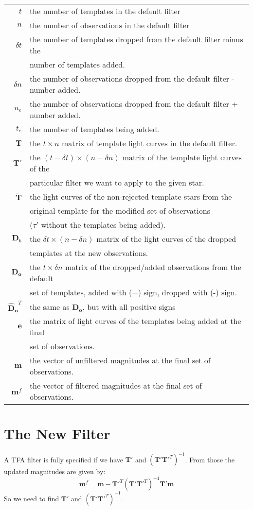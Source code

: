 \documentclass{article}
\begin{document}
\begin{tabular}{rl}
	$t$ & the number of templates in the default filter\\
%	
	$n$ & the number of observations in the default filter\\
%
	$\delta t$ & the number of templates dropped from the default filter 
	minus the \\&number of templates added.\\
%
	$\delta n$ & the number of observations dropped from the default filter -
	number added.\\
%
	$n_e$ & the number of observations dropped from the default filter +
	number added.\\
%
	$t_e$ & the number of templates being added. \\
%
	$\mathbf{T}$ & the $t\times n$ matrix of template light curves in the
	default filter.\\
%
	$\mathbf{T'}$ & the $(t-\delta t)\times(n-\delta n)$ matrix of the
	template light curves of the \\&particular filter we want to apply to the
	given star.\\
%
	$\mathbf{\tilde{T}}$ & the light curves of the non-rejected template
	stars from the \\&original template for the modified set of observations
	\\&($\tau'$ without the templates being added).\\
%
	$\mathbf{D_t}$ & the $\delta t\times (n-\delta n)$ matrix of the light
	curves of the dropped \\&templates at the new observations.\\
%
	$\mathbf{D_o}$ & the $t\times \delta n$ matrix of the dropped/added
	observations from the default \\&set of templates, added with (+) sign,
	dropped with (-) sign.\\
%
	$\mathbf{\hat{D}_o}^T$ & the same as $\mathbf{D_o}$, but with all 
	positive signs\\
%
	$\mathbf{e}$ & the matrix of light curves of the templates being added at
	the final \\&set of observations.\\
%
	$\mathbf{m}$ & the vector of unfiltered magnitudes at the final set of
	observations.\\
%
	$\mathbf{m}^f$ & the vector of filtered magnitudes at the final set of
	observations.
\end{tabular}

\section{The New Filter}
A TFA filter is fully specified if we have $\mathbf{T'}$ and
$\left(\mathbf{T'T'}^T\right)^{-1}$. From those the updated magnitudes are
given by:
\begin{equation}
	\mathbf{m}^f=\mathbf{m}-\mathbf{T'}^T\left(\mathbf{T'T'}^T\right)^{-1}
	\mathbf{T'm}
\end{equation}
So we need to find $\mathbf{T'}$ and $\left(\mathbf{T'T'}^T\right)^{-1}$.
\end{document}
